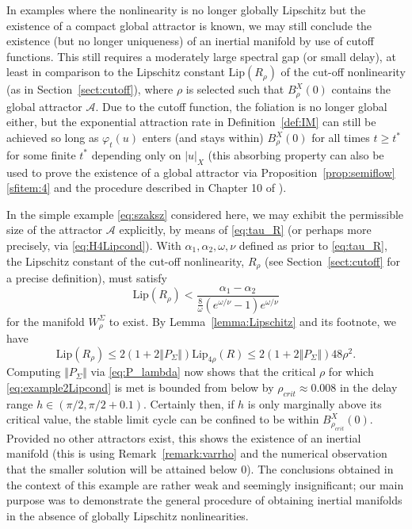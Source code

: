 \documentclass[a4paper, 12pt, oneside, reqno, notitlepage]{amsart}
\theoremstyle{plain}
\theoremstyle{definition}
\theoremstyle{remark}
\newcommand{\lip}{\mathrm{Lip}}
\begin{document}
In examples where the nonlinearity is no longer globally Lipschitz but the existence of a compact global attractor is known, we may still conclude the existence (but no longer uniqueness) of an inertial manifold by use of cutoff functions.
This still requires a moderately large spectral gap (or small delay), at least in comparison to the Lipschitz constant $\lip(R_\rho)$ of the cut-off nonlinearity (as in Section~\ref{sect:cutoff}), where $\rho$ is selected such that $B_\rho^X(0)$ contains the global attractor $\mathcal{A}$. 
Due to the cutoff function, the foliation is no longer global either, but the exponential attraction rate in Definition~\ref{def:IM} can still be achieved so long as $\varphi_t(u)$ enters (and stays within) $B_\rho^X(0)$ for all times $t \geq t^*$ for some finite $t^*$ depending only on $|u|_X$ (this absorbing property can also be used to prove the existence of a global attractor via Proposition~\ref{prop:semiflow}\ref{sfitem:4} and the procedure described in Chapter 10 of \cite{robinson2001}).





In the simple example \eqref{eq:szaksz} considered here, we may exhibit the permissible size of the attractor $\mathcal{A}$ explicitly, by means of \eqref{eq:tau_R} (or perhaps more precisely, via \eqref{eq:H4Lipcond}).
With $\alpha_1,\alpha_2,\omega,\nu$ defined as prior to \eqref{eq:tau_R}, the Lipschitz constant of the cut-off nonlinearity, $R_\rho$ (see Section~\ref{sect:cutoff} for a precise definition), must satisfy
\begin{equation}
    \lip(R_\rho) < \frac{\alpha_1-\alpha_2}{\frac{8}{\omega} \left( e^{\omega /\nu} - 1 \right)  e^{\omega /\nu}}
    \label{eq:example2Lipcond}
\end{equation}
for the manifold $W^\Sigma_\rho$ to exist.
By Lemma~\ref{lemma:Lipschitz} and its footnote, we have
\begin{displaymath}
    \lip(R_\rho) \leq 2(1+2\Vert P_\Sigma \Vert)\lip_{4\rho}(R) \leq2(1+2\Vert P_\Sigma \Vert) 48\rho^2.
\end{displaymath}
Computing $\Vert P_\Sigma \Vert$ via \eqref{eq:P_lambda} now shows that 
the critical $\rho$ for which \eqref{eq:example2Lipcond} is met is bounded from below by $\rho_{crit} \approx 0.008$ in the delay range $h \in (\pi/2,\pi/2+0.1)$. 
Certainly then, if $h$ is only marginally above its critical value, the stable limit cycle can be confined to be within $B^X_{\rho_{crit}}(0)$. 
Provided no other attractors exist, this shows the existence of an inertial manifold (this is using Remark~\ref{remark:varrho} and the numerical observation that the smaller solution will be attained below $0$).
The conclusions obtained in the context of this example are rather weak and seemingly insignificant; our main purpose was to demonstrate the general procedure of obtaining inertial manifolds in the absence of globally Lipschitz nonlinearities.
\end{document}
